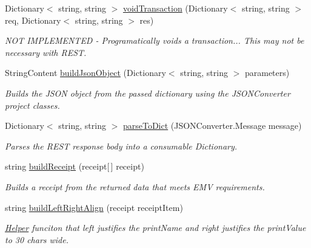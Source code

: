 \begin{DoxyCompactItemize}
\item 
Dictionary$<$ string, string $>$ \mbox{\hyperlink{class_form_sim_1_1_rest_handler_a7c2e17caa0c591a104e9e4f9a3825f47}{void\+Transaction}} (Dictionary$<$ string, string $>$ req, Dictionary$<$ string, string $>$ res)
\begin{DoxyCompactList}\small\item\em N\+OT I\+M\+P\+L\+E\+M\+E\+N\+T\+ED -\/ Programatically voids a transaction... This may not be necessary with R\+E\+ST. \end{DoxyCompactList}\item 
String\+Content \mbox{\hyperlink{class_form_sim_1_1_rest_handler_a92192f6edc3e39d00b37dea3f8f16d93}{build\+Json\+Object}} (Dictionary$<$ string, string $>$ parameters)
\begin{DoxyCompactList}\small\item\em Builds the J\+S\+ON object from the passed dictionary using the J\+S\+O\+N\+Converter project classes. \end{DoxyCompactList}\item 
Dictionary$<$ string, string $>$ \mbox{\hyperlink{class_form_sim_1_1_rest_handler_a08ab06f861daa5acaf1aca9ea2fe8c9b}{parse\+To\+Dict}} (J\+S\+O\+N\+Converter.\+Message message)
\begin{DoxyCompactList}\small\item\em Parses the R\+E\+ST response body into a consumable Dictionary. \end{DoxyCompactList}\item 
string \mbox{\hyperlink{class_form_sim_1_1_rest_handler_ab10dcc5c39fdf95b190ed6b50d6e1ce6}{build\+Receipt}} (receipt\mbox{[}$\,$\mbox{]} receipt)
\begin{DoxyCompactList}\small\item\em Builds a receipt from the returned data that meets E\+MV requirements. \end{DoxyCompactList}\item 
string \mbox{\hyperlink{class_form_sim_1_1_rest_handler_adb1e6344809870d5b196de0c6e54a3c9}{build\+Left\+Right\+Align}} (receipt receipt\+Item)
\begin{DoxyCompactList}\small\item\em \mbox{\hyperlink{class_form_sim_1_1_helper}{Helper}} funciton that left justifies the print\+Name and right justifies the print\+Value to 30 chars wide. \end{DoxyCompactList}\item 

\end{DoxyCompactItemize}
